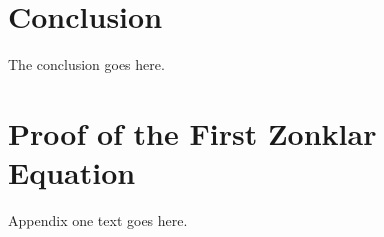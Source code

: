 \documentclass[journal]{IEEEtran}
\begin{document}







\section{Conclusion}
The conclusion goes here.






%


\appendices
\section{Proof of the First Zonklar Equation}
Appendix one text goes here.
\end{document}

